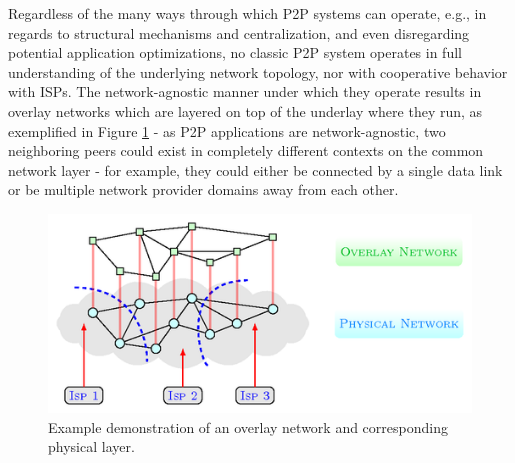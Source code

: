     Regardless of the many ways through which P2P systems can operate, e.g., in regards to structural mechanisms and centralization, and even disregarding potential application optimizations, no classic P2P system operates in full understanding of the underlying network topology, nor with cooperative behavior with ISPs.
    The network-agnostic manner under which they operate results in overlay networks which are layered on top of the underlay where they run, as exemplified in Figure \ref{fig:overlay-underlay} - as P2P applications are network-agnostic, two neighboring peers could exist in completely different contexts on the common network layer - for example, they could either be connected by a single data link or be multiple network provider domains away from each other.

\begin{figure}[!h]
\centering
\includegraphics[scale=3.0]{img/p2p-topology.png}
\caption{Example demonstration of an overlay network and corresponding physical layer.}
\label{fig:overlay-underlay}
\end{figure}

